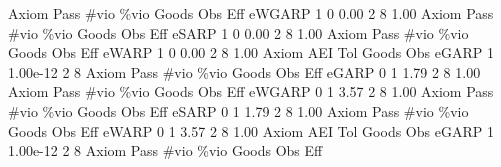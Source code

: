 {\smallskip}
{\smallskip}
       Axiom {\VBAR} Pass        \#vio        \%vio       Goods         Obs         Eff  
      eWGARP {\VBAR}    1           0        0.00           2           8        1.00  
{\smallskip}
{\smallskip}
{\smallskip}
       Axiom {\VBAR} Pass        \#vio        \%vio       Goods         Obs         Eff  
       eSARP {\VBAR}    1           0        0.00           2           8        1.00  
{\smallskip}
{\smallskip}
{\smallskip}
       Axiom {\VBAR} Pass        \#vio        \%vio       Goods         Obs         Eff  
       eWARP {\VBAR}    1           0        0.00           2           8        1.00  
{\smallskip}
       Axiom {\VBAR}       AEI        Tol      Goods        Obs 
       eGARP {\VBAR}         1   1.00e-12          2          8 
{\smallskip}
{\smallskip}
{\smallskip}
       Axiom {\VBAR} Pass        \#vio        \%vio       Goods         Obs         Eff  
       eGARP {\VBAR}    0           1        1.79           2           8        1.00  
{\smallskip}
{\smallskip}
{\smallskip}
       Axiom {\VBAR} Pass        \#vio        \%vio       Goods         Obs         Eff  
      eWGARP {\VBAR}    0           1        3.57           2           8        1.00  
{\smallskip}
{\smallskip}
{\smallskip}
       Axiom {\VBAR} Pass        \#vio        \%vio       Goods         Obs         Eff  
       eSARP {\VBAR}    0           1        1.79           2           8        1.00  
{\smallskip}
{\smallskip}
{\smallskip}
       Axiom {\VBAR} Pass        \#vio        \%vio       Goods         Obs         Eff  
       eWARP {\VBAR}    0           1        3.57           2           8        1.00  
{\smallskip}
       Axiom {\VBAR}       AEI        Tol      Goods        Obs 
       eGARP {\VBAR}         1   1.00e-12          2          8 
{\smallskip}
{\smallskip}
{\smallskip}
       Axiom {\VBAR} Pass        \#vio        \%vio       Goods         Obs         Eff  
